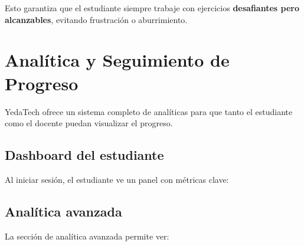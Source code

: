 \documentclass[12pt, a4paper]{article}
\begin{document}
Esto garantiza que el estudiante siempre trabaje con ejercicios \textbf{desafiantes pero alcanzables}, evitando frustración o aburrimiento.

\section{Analítica y Seguimiento de Progreso}

YedaTech ofrece un sistema completo de analíticas para que tanto el estudiante como el docente puedan visualizar el progreso.

\subsection{Dashboard del estudiante}

Al iniciar sesión, el estudiante ve un panel con métricas clave:

\begin{center}
\end{center}

\subsection{Analítica avanzada}

La sección de analítica avanzada permite ver:
\end{document}
